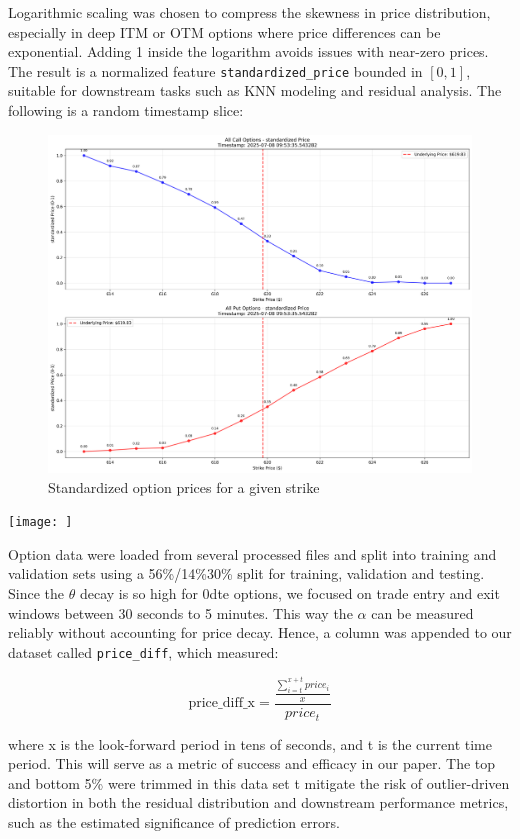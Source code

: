 \documentclass{article}
\begin{document}
Logarithmic scaling was chosen to compress the skewness in price distribution, especially in deep ITM or OTM options where price differences can be exponential. Adding 1 inside the logarithm avoids issues with near-zero prices. The result is a normalized feature \texttt{standardized\_price} bounded in \([0, 1]\), suitable for downstream tasks such as KNN modeling and residual analysis. The following is a random timestamp slice:
\begin{figure}[h]
  \centering
  \includegraphics[width=0.8\linewidth]{calls_puts_timestamp_329}
  \caption{Standardized option prices for a given strike}
  \label{fig:price-std}
\end{figure}
\texttt{[image: ]}

Option data were loaded from several processed files and split into training and validation sets using a 56\%/14\%30\% split for training, validation and testing. 
Since the $\theta$ decay is so high for 0dte options, we focused on trade entry and exit windows between 30 seconds to 5 minutes. This way the $\alpha$ can be measured reliably without accounting for price decay. Hence, a column was appended to our dataset called \texttt{price\_diff}, which measured:

\[
\text{price\_diff_x} = \frac{\frac{\sum_{i=t}^{x+t}{price_i}}{x}}{price_{t}}
\]

where x is the look-forward period in tens of seconds, and t is the current time period. This will serve as a metric of success and efficacy in our paper. The top and bottom 5\% were trimmed in this data set t mitigate the risk of outlier-driven distortion in both the residual distribution and downstream performance metrics, such as the estimated significance of prediction errors.
\end{document}
